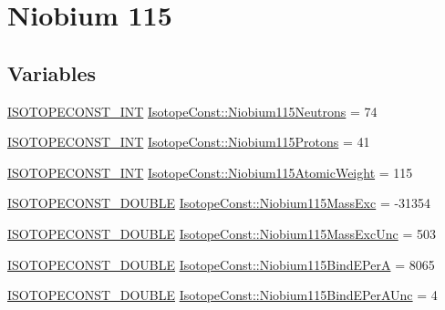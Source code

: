\hypertarget{group___isotope_const-_niobium-_nb115}{}\section{Niobium 115}
\label{group___isotope_const-_niobium-_nb115}
\subsection*{Variables}
\begin{DoxyCompactItemize}
\item 
\mbox{\hyperlink{group___isotope_const-_macros_ga5f18360b3e99483a35c32d789e62621c}{I\+S\+O\+T\+O\+P\+E\+C\+O\+N\+S\+T\+\_\+\+I\+NT}} \mbox{\hyperlink{group___isotope_const-_niobium-_nb115_gabe81cda551d3aba1bb57f3355ea5bc44}{Isotope\+Const\+::\+Niobium115\+Neutrons}} = 74
\item 
\mbox{\hyperlink{group___isotope_const-_macros_ga5f18360b3e99483a35c32d789e62621c}{I\+S\+O\+T\+O\+P\+E\+C\+O\+N\+S\+T\+\_\+\+I\+NT}} \mbox{\hyperlink{group___isotope_const-_niobium-_nb115_ga7adea44e10129271b340bfbc20749b19}{Isotope\+Const\+::\+Niobium115\+Protons}} = 41
\item 
\mbox{\hyperlink{group___isotope_const-_macros_ga5f18360b3e99483a35c32d789e62621c}{I\+S\+O\+T\+O\+P\+E\+C\+O\+N\+S\+T\+\_\+\+I\+NT}} \mbox{\hyperlink{group___isotope_const-_niobium-_nb115_ga875aefdf1fdce2bceb9e8cf411745089}{Isotope\+Const\+::\+Niobium115\+Atomic\+Weight}} = 115
\item 
\mbox{\hyperlink{group___isotope_const-_macros_ga8f45a7272ce02c0b4c65c44636ed719a}{I\+S\+O\+T\+O\+P\+E\+C\+O\+N\+S\+T\+\_\+\+D\+O\+U\+B\+LE}} \mbox{\hyperlink{group___isotope_const-_niobium-_nb115_gabadaa412bdfea4cf1e7e2931fb70d4b8}{Isotope\+Const\+::\+Niobium115\+Mass\+Exc}} = -\/31354
\item 
\mbox{\hyperlink{group___isotope_const-_macros_ga8f45a7272ce02c0b4c65c44636ed719a}{I\+S\+O\+T\+O\+P\+E\+C\+O\+N\+S\+T\+\_\+\+D\+O\+U\+B\+LE}} \mbox{\hyperlink{group___isotope_const-_niobium-_nb115_gaeb6a13a17a21f16e0867930c5ce12689}{Isotope\+Const\+::\+Niobium115\+Mass\+Exc\+Unc}} = 503
\item 
\mbox{\hyperlink{group___isotope_const-_macros_ga8f45a7272ce02c0b4c65c44636ed719a}{I\+S\+O\+T\+O\+P\+E\+C\+O\+N\+S\+T\+\_\+\+D\+O\+U\+B\+LE}} \mbox{\hyperlink{group___isotope_const-_niobium-_nb115_gaf2f6bb42bbddd3f7e6cefebb282bcc0e}{Isotope\+Const\+::\+Niobium115\+Bind\+E\+PerA}} = 8065
\item 
\mbox{\hyperlink{group___isotope_const-_macros_ga8f45a7272ce02c0b4c65c44636ed719a}{I\+S\+O\+T\+O\+P\+E\+C\+O\+N\+S\+T\+\_\+\+D\+O\+U\+B\+LE}} \mbox{\hyperlink{group___isotope_const-_niobium-_nb115_ga376154d79f86730085e8b0f2beb2293d}{Isotope\+Const\+::\+Niobium115\+Bind\+E\+Per\+A\+Unc}} = 4

\end{DoxyCompactItemize}
